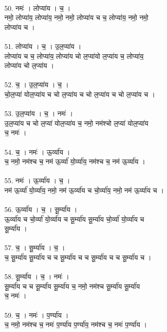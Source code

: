\\
50. नमः॑ । लोप्या॑य । च॒ ।\\
नमो॒ लोप्या॑य॒ लोप्या॑य॒ नमो॒ नमो॒ लोप्या॑य च च॒ लोप्या॑य॒ नमो॒ नमो॒\\
लोप्या॑य च ।\\
\\
51. लोप्या॑य । च॒ । उ॒ल॒प्या॑य ।\\
लोप्या॑य च च॒ लोप्या॑य॒ लोप्या॑य चो ल॒प्या॑यो ल॒प्या॑य च॒ लोप्या॑य॒\\
लोप्या॑य चो ल॒प्या॑य ।\\
\\
52. च॒ । उ॒ल॒प्या॑य । च॒ ।\\
चो॒ल॒प्या॑ योल॒प्या॑य च चो ल॒प्या॑य च चो ल॒प्या॑य च चो ल॒प्या॑य च ।\\
\\
53. उ॒ल॒प्या॑य । च॒ । नमः॑ ।\\
उ॒ल॒प्या॑य च चो ल॒प्या॑ योल॒प्या॑य च॒ नमो॒ नम॑श्चो ल॒प्या॑ योल॒प्या॑य\\
च॒ नमः॑ ।\\
\\
54. च॒ । नमः॑ । ऊ॒र्व्या॑य ।\\
च॒ नमो॒ नम॑श्च च॒ नम॑ ऊ॒र्व्या॑ यो॒र्व्या॑य॒ नम॑श्च च॒ नम॑ ऊ॒र्व्या॑य ।\\
\\
55. नमः॑ । ऊ॒र्व्या॑य । च॒ ।\\
नम॑ ऊ॒र्व्या॑ यो॒र्व्या॑य॒ नमो॒ नम॑ ऊ॒र्व्या॑य च चो॒र्व्या॑य॒ नमो॒ नम॑ ऊ॒र्व्या॑य च ।\\
\\
56. ऊ॒र्व्या॑य । च॒ । सू॒र्म्या॑य ।\\
ऊ॒र्व्या॑य च चो॒र्व्या॑ यो॒र्व्या॑य च सू॒र्म्या॑य सू॒र्म्या॑य चो॒र्व्या॑ यो॒र्व्या॑य च\\
सू॒र्म्या॑य ।\\
\\
57. च॒ । सू॒र्म्या॑य । च॒ ।\\
च॒ सू॒र्म्या॑य सू॒र्म्या॑य च च सू॒र्म्या॑य च च सू॒र्म्या॑य च च सू॒र्म्या॑य च ।\\
\\
58. सू॒र्म्या॑य । च॒ । नमः॑ ।\\
सू॒र्म्या॑य च च सू॒र्म्या॑य सू॒र्म्या॑य च॒ नमो॒ नम॑श्च सू॒र्म्या॑य सू॒र्म्या॑य\\
च॒ नमः॑ ।\\
\\
59. च॒ । नमः॑ । प॒र्ण्या॑य ।\\
च॒ नमो॒ नम॑श्च च॒ नमः॑ प॒र्ण्या॑य प॒र्ण्या॑य॒ नम॑श्च च॒ नमः॑ प॒र्ण्या॑य ।\\
\\
